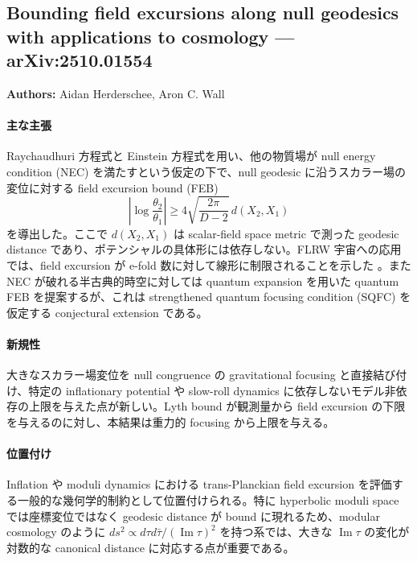 \subsection{Bounding field excursions along null geodesics with applications to cosmology --- arXiv:2510.01554}

\textbf{Authors:} Aidan Herderschee, Aron C. Wall

\paragraph{主な主張}
Raychaudhuri 方程式と Einstein 方程式を用い、他の物質場が null energy condition (NEC) を満たすという仮定の下で、null geodesic に沿うスカラー場の変位に対する field excursion bound (FEB)
\[
\left|\log\frac{\theta_2}{\theta_1}\right|
\geq
4\sqrt{\frac{2\pi}{D-2}}\,d(X_2,X_1)
\]
を導出した。ここで $d(X_2,X_1)$ は scalar-field space metric で測った geodesic distance であり、ポテンシャルの具体形には依存しない。FLRW 宇宙への応用では、field excursion が e-fold 数に対して線形に制限されることを示した \cite{Herderschee:2025FEB}。また NEC が破れる半古典的時空に対しては quantum expansion を用いた quantum FEB を提案するが、これは strengthened quantum focusing condition (SQFC) を仮定する conjectural extension である。

\paragraph{新規性}
大きなスカラー場変位を null congruence の gravitational focusing と直接結び付け、特定の inflationary potential や slow-roll dynamics に依存しないモデル非依存の上限を与えた点が新しい。Lyth bound が観測量から field excursion の下限を与えるのに対し、本結果は重力的 focusing から上限を与える。

\paragraph{位置付け}
Inflation や moduli dynamics における trans-Planckian field excursion を評価する一般的な幾何学的制約として位置付けられる。特に hyperbolic moduli space では座標変位ではなく geodesic distance が bound に現れるため、modular cosmology のように $ds^2\propto d\tau d\bar\tau/(\operatorname{Im}\tau)^2$ を持つ系では、大きな $\operatorname{Im}\tau$ の変化が対数的な canonical distance に対応する点が重要である。
